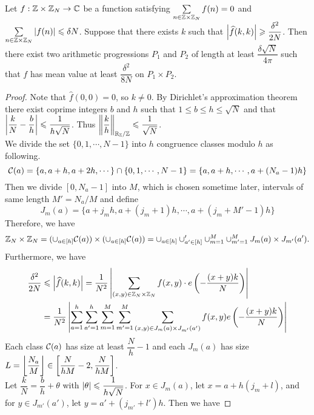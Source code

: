 \begin{lemma} \label{lem:density-increment}
	Let $ f : {\mathbb Z} \times {\mathbb Z}_N \rightarrow {\mathbb C} $ be a function satisfying $ \sum\limits_{n \in {\mathbb Z} \times {\mathbb Z}_N} f(n) = 0 $ and $\sum\limits_{n \in {\mathbb Z} \times {\mathbb Z}_N} \left\vert{f(n)}\right\vert \leqslant \delta N $. Suppose that there exists $ k $ such that $ \left\vert{\widehat{f}(k, k)}\right\vert \geqslant \dfrac{\delta^2}{2N} $. Then there exist two arithmetic progressions $ P_1 $ and $ P_2 $ of length at least $ \dfrac{\delta \sqrt{N}}{4\pi} $ such that $ f $ has mean value at least $ \dfrac{\delta^2}{8N} $ on $ P_1 \times P_2 $.
\end{lemma}

\begin{proof}
	Note that $ \widehat{f}(0,0) = 0 $, so $ k \neq 0 $. By Dirichlet's approximation theorem there exist coprime integers $ b $ and $ h $ such that $ 1 \leq b \leq h \leq \sqrt{N} $ and that $ \left\vert{\dfrac{k}{N} - \dfrac{b}{h}}\right\vert \leqslant \dfrac{1}{h \sqrt{N}} $. Thus $ \left\| \dfrac{k}{h}\right\|_{{\mathbb R}_{\mathbb Z}/{\mathbb Z}} \leqslant \dfrac{1}{\sqrt{N}} $. \\
	We divide the set $ \{0, 1, \cdots, N-1\} $ into $ h $ congruence classes modulo $ h $ as following. 
	$$ {\mathcal C}(a) = \{a , a+h, a+ 2h, \cdots\} \cap \{0, 1, \cdots, N-1\} = \{a, a+h, \cdots, a+(N_a -1 )h \} $$
	Then we divide $ [0, N_a -1] $ into $ M $, which is chosen sometime later, intervals of same length $ M' = N_a/M $ and define
	$$ J_m(a) = \{a + j_m h , a+ (j_m +1)h, \cdots, a + (j_m + M' -1)h \} $$
	Therefore, we have 
	$$ {\mathbb Z}_N \times {\mathbb Z}_N = (\cup_{a \in [h]} {\mathcal C}(a)) \times (\cup_{a \in [h]} {\mathcal C}(a)) = \cup_{a \in [h]} \cup_{a' \in [h]}' \cup_{m =1}^{M} \cup_{m' = 1}^M J_m(a) \times J_{m'}(a'). $$
	Furthermore, we have 
	\begin{align*}
		\dfrac{\delta^2}{2N} &\leq \abs{\widehat{f}(k,k)} = \dfrac{1}{N^2} \abs{\sum\limits_{(x,y) \in \bbZ_N \times \bbZ_N}  f(x,y) \cdot e\left(-\dfrac{(x+y)k}{N}\right)}\\
		& = \dfrac{1}{N^2} \abs{\sum\limits_{a = 1}^h \sum\limits_{a' = 1} ^h \sum\limits_{m = 1}^M \sum\limits_{m' = 1}^M \sum\limits_{(x,y) \in J_m(a) \times J_{m'}(a')} f(x,y) e\left(-\dfrac{(x+y)k}{N}\right)}
	\end{align*}
	Each class $ {\mathcal C}(a) $ has size at least $ \dfrac{N}{h} -1 $ and each $ J_m(a) $ has size $ L = \left\lfloor{\dfrac{N_a}{M}}\right\rfloor \in \left[\dfrac{N}{hM} - 2, \dfrac{N}{hM} \right] $. \\
	Let $ \dfrac{k}{N} = \dfrac{b}{h} + \theta $ with $ \left\vert{\theta}\right\vert \leqslant \dfrac{1}{h\sqrt{N}} $. For $ x \in J_m(a) $, let $ x = a + h(j_m + l) $, and for $ y \in J_{m'}(a') $, let $ y = a' + (j_{m'} + l')h $. Then we have

\end{proof}
